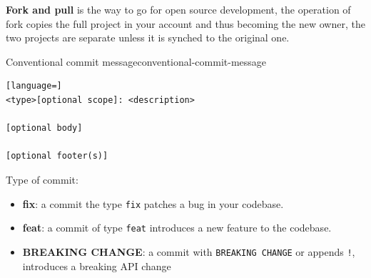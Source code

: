 \documentclass[12pt]{article}
\begin{document}
\textbf{Fork and pull} is the way to go for open source development, the operation of fork copies the full project in your account and thus becoming the new owner, the two projects are separate unless it is synched to the original one.
\begin{definition}{Conventional commit message}{conventional-commit-message}
\begin{lstlisting}[language=]
<type>[optional scope]: <description>

[optional body]

[optional footer(s)]
\end{lstlisting}
  Type of commit: 
  \begin{itemize}
    \item \textbf{fix}: a commit the type \texttt{fix} patches a bug in your codebase.
    \item \textbf{feat}: a commit of type \texttt{feat} introduces a new feature to the codebase.
    \item \textbf{BREAKING CHANGE}: a commit with \texttt{BREAKING CHANGE} or appends \texttt{!}, introduces a breaking API change
  \end{itemize}
\end{definition}
\end{document}

